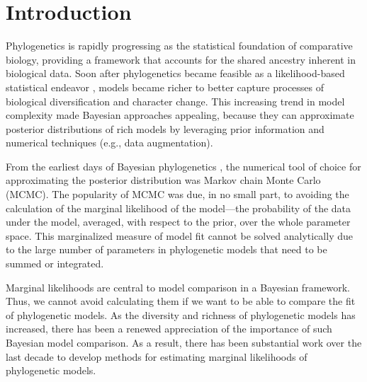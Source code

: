 \section{Introduction}

Phylogenetics is rapidly progressing as the statistical foundation of
comparative biology, providing a framework that accounts for the shared
ancestry inherent in biological data.
Soon after phylogenetics became feasible as a likelihood-based statistical
endeavor \citep{Felsenstein1981}, models became richer to better
capture processes of biological diversification and character change.
This increasing trend in model complexity made Bayesian approaches appealing,
because they can approximate posterior distributions of rich models by
leveraging prior information and numerical techniques (e.g., data
augmentation).

From the earliest days of Bayesian phylogenetics \citep{Rannala1996,Mau1997},
the numerical tool of choice for approximating the posterior distribution was
Markov chain Monte Carlo (MCMC).
The popularity of MCMC was due, in no small part, to avoiding the calculation
of the marginal likelihood of the model---the probability of the data under the
model, averaged, with respect to the prior, over the whole parameter space.
This marginalized measure of model fit cannot be solved analytically due to
the large number of parameters in phylogenetic models that need to be summed or
integrated. 

Marginal likelihoods are central to model comparison in a Bayesian framework.
Thus, we cannot avoid calculating them if we want to be able to compare the fit
of phylogenetic models.
As the diversity and richness of phylogenetic models has increased, there has
been a renewed appreciation of the importance of such Bayesian model
comparison.
As a result, there has been substantial work over the last decade to develop
methods for estimating marginal likelihoods of phylogenetic models.

